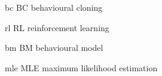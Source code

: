\newacronym
  {bc}%
  {BC}%
  {behavioural cloning}

\newacronym
  {rl}%
  {RL}%
  {reinforcement learning}

\newacronym
  {bm}%
  {BM}%
  {behavioural model}

\newacronym
  {mle}%
  {MLE}%
  {maximum likelihood estimation}